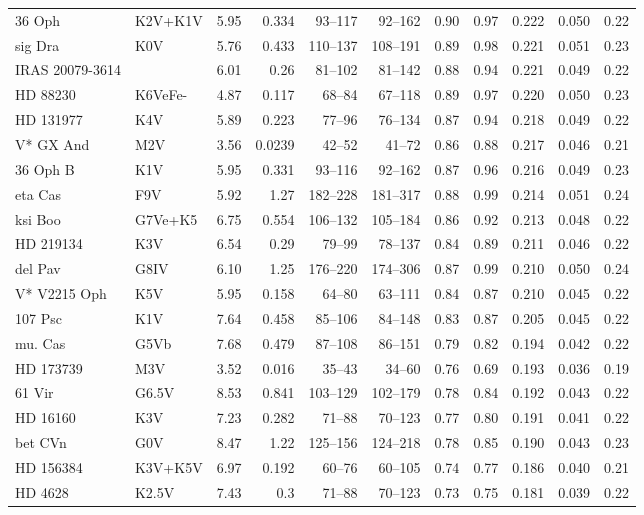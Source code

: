 \documentclass[11pt,a4paper]{article}
\begin{document}
{\begin{longtable}{llrrrrrrrrr}
36 Oph & K2V+K1V & 5.95 & 0.334 & 93--117 & 92--162 & 0.90 & 0.97 & 0.222 & 0.050 & 0.22 \\
sig Dra & K0V & 5.76 & 0.433 & 110--137 & 108--191 & 0.89 & 0.98 & 0.221 & 0.051 & 0.23 \\
IRAS 20079-3614 &  & 6.01 & 0.26 & 81--102 & 81--142 & 0.88 & 0.94 & 0.221 & 0.049 & 0.22 \\
HD  88230 & K6VeFe- & 4.87 & 0.117 & 68--84 & 67--118 & 0.89 & 0.97 & 0.220 & 0.050 & 0.23 \\
HD 131977 & K4V & 5.89 & 0.223 & 77--96 & 76--134 & 0.87 & 0.94 & 0.218 & 0.049 & 0.22 \\
V* GX And & M2V & 3.56 & 0.0239 & 42--52 & 41--72 & 0.86 & 0.88 & 0.217 & 0.046 & 0.21 \\
36 Oph B & K1V & 5.95 & 0.331 & 93--116 & 92--162 & 0.87 & 0.96 & 0.216 & 0.049 & 0.23 \\
eta Cas & F9V & 5.92 & 1.27 & 182--228 & 181--317 & 0.88 & 0.99 & 0.214 & 0.051 & 0.24 \\
ksi Boo & G7Ve+K5 & 6.75 & 0.554 & 106--132 & 105--184 & 0.86 & 0.92 & 0.213 & 0.048 & 0.22 \\
HD 219134 & K3V & 6.54 & 0.29 & 79--99 & 78--137 & 0.84 & 0.89 & 0.211 & 0.046 & 0.22 \\
del Pav & G8IV & 6.10 & 1.25 & 176--220 & 174--306 & 0.87 & 0.99 & 0.210 & 0.050 & 0.24 \\
V* V2215 Oph & K5V & 5.95 & 0.158 & 64--80 & 63--111 & 0.84 & 0.87 & 0.210 & 0.045 & 0.22 \\
107 Psc & K1V & 7.64 & 0.458 & 85--106 & 84--148 & 0.83 & 0.87 & 0.205 & 0.045 & 0.22 \\
mu. Cas & G5Vb & 7.68 & 0.479 & 87--108 & 86--151 & 0.79 & 0.82 & 0.194 & 0.042 & 0.22 \\
HD 173739 & M3V & 3.52 & 0.016 & 35--43 & 34--60 & 0.76 & 0.69 & 0.193 & 0.036 & 0.19 \\
61 Vir & G6.5V & 8.53 & 0.841 & 103--129 & 102--179 & 0.78 & 0.84 & 0.192 & 0.043 & 0.22 \\
HD  16160 & K3V & 7.23 & 0.282 & 71--88 & 70--123 & 0.77 & 0.80 & 0.191 & 0.041 & 0.22 \\
bet CVn & G0V & 8.47 & 1.22 & 125--156 & 124--218 & 0.78 & 0.85 & 0.190 & 0.043 & 0.23 \\
HD 156384 & K3V+K5V & 6.97 & 0.192 & 60--76 & 60--105 & 0.74 & 0.77 & 0.186 & 0.040 & 0.21 \\
HD   4628 & K2.5V & 7.43 & 0.3 & 71--88 & 70--123 & 0.73 & 0.75 & 0.181 & 0.039 & 0.22 \\

\end{longtable}}
\end{document}
